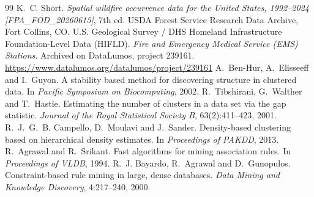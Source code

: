 \documentclass[10pt,twocolumn,letterpaper]{article}
\begin{document}
\begin{thebibliography}{99}
 K.~C. Short. \emph{Spatial wildfire occurrence data for the United States, 1992--2024 [FPA\_FOD\_20260615]}, 7th ed. USDA Forest Service Research Data Archive, Fort Collins, CO.
 U.S. Geological Survey / DHS Homeland Infrastructure Foundation-Level Data (HIFLD). \emph{Fire and Emergency Medical Service (EMS) Stations}. Archived on DataLumos, project 239161. \url{https://www.datalumos.org/datalumos/project/239161}
 A.~Ben-Hur, A.~Elisseeff and I.~Guyon. A stability based method for discovering structure in clustered data. In \emph{Pacific Symposium on Biocomputing}, 2002.
 R.~Tibshirani, G.~Walther and T.~Hastie. Estimating the number of clusters in a data set via the gap statistic. \emph{Journal of the Royal Statistical Society B}, 63(2):411--423, 2001.
 R.~J.~G.~B. Campello, D.~Moulavi and J.~Sander. Density-based clustering based on hierarchical density estimates. In \emph{Proceedings of PAKDD}, 2013.
 R.~Agrawal and R.~Srikant. Fast algorithms for mining association rules. In \emph{Proceedings of VLDB}, 1994.
 R.~J. Bayardo, R.~Agrawal and D.~Gunopulos. Constraint-based rule mining in large, dense databases. \emph{Data Mining and Knowledge Discovery}, 4:217--240, 2000.
\end{thebibliography}
\end{document}

